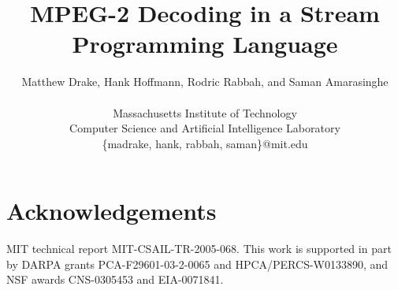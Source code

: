 \documentclass[10pt,twocolumn]{article}
\title{MPEG-2 Decoding in a Stream Programming Language}
\author{
  Matthew Drake, Hank Hoffmann, Rodric Rabbah, and Saman Amarasinghe\\
  \begin{twoaffiliations}
    Massachusetts Institute of Technology\\
    Computer Science and Artificial Intelligence Laboratory\\
    \{madrake, hank, rabbah, saman\}@mit.edu
  \end{twoaffiliations}
}
\begin{document}
  
  \maketitle
  \thispagestyle{empty}
  
  \begin{abstract}
    
  \end{abstract}
  
  
  
  
  
  
  
  
  \section*{Acknowledgements}
  MIT technical report MIT-CSAIL-TR-2005-068. This work is supported
  in part by DARPA grants PCA-F29601-03-2-0065 and
  HPCA/PERCS-W0133890, and NSF awards CNS-0305453 and EIA-0071841.
  
  
  
  
\end{document}
